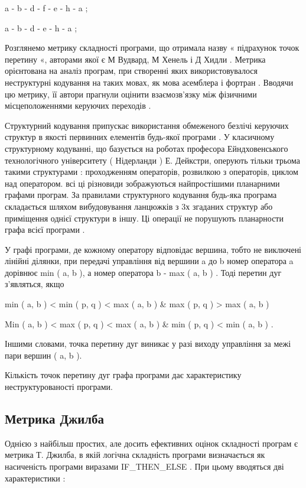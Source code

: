 a - b - d - f - e - h - a ;

a - b - d - e - h - a ;

Розглянемо метрику складності програми, що отримала назву « підрахунок точок перетину «, авторами якої є М Вудвард, М Хенель і Д Хидли . Метрика орієнтована на аналіз програм, при створенні яких використовувалося неструктурні кодування на таких мовах, як мова асемблера і фортран . Вводячи цю метрику, її автори прагнули оцінити взаємозв'язку між фізичними місцеположеннями керуючих переходів .

Структурний кодування припускає використання обмеженого безлічі керуючих структур в якості первинних елементів будь-якої програми . У класичному структурному кодуванні, що базується на роботах професора Ейндховенського технологічного університету ( Нідерланди ) Е. Дейкстри, оперують тільки трьома такими структурами : проходженням операторів, розвилкою з операторів, циклом над оператором. всі ці різновиди зображуються найпростішими планарними графами програм. За правилами структурного кодування будь-яка програма складається шляхом вибудовування ланцюжків з 3х згаданих структур або приміщення однієї структури в іншу. Ці операції не порушують планарности графа всієї програми .

У графі програми, де кожному оператору відповідає вершина, тобто не виключені лінійні ділянки, при передачі управління від вершини a до b номер оператора a дорівнює min ( a, b ), а номер оператора b - max ( a, b ) . Тоді перетин дуг з'являться, якщо

min ( a, b ) \textless{} min ( p, q ) \textless{} max ( a, b ) \& max ( p, q ) \textgreater{} max ( a, b ) \textbar{}

\begin{list}{0em}
\item[] Min ( a, b ) \textless{} max ( p, q ) \textless{} max ( a, b ) \& min ( p, q ) \textless{} min ( a, b ) .
\end{list}

Іншими словами, точка перетину дуг виникає у разі виходу управління за межі пари вершин ( a, b ).

Кількість точок перетину дуг графа програми дає характеристику неструктурованості програми.


\subsection{Метрика Джилба}
\label{2section:id12}
Однією з найбільш простих, але досить ефективних оцінок складності програм є метрика Т. Джилба, в якій логічна складність програми визначається як насиченість програми виразами IF\_THEN\_ELSE . При цьому вводяться дві характеристики :

